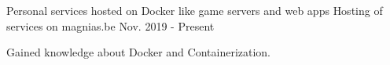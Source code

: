 

\begin{cventries}

  \cventry
    {Personal services hosted on Docker like game servers and web apps} %
    {Hosting of services on magnias.be} %
    {} %
    {Nov. 2019 - Present} %
    {
      \begin{cvitems} %
        \item {Gained knowledge about Docker and Containerization.}
      \end{cvitems}
    }


\end{cventries}
